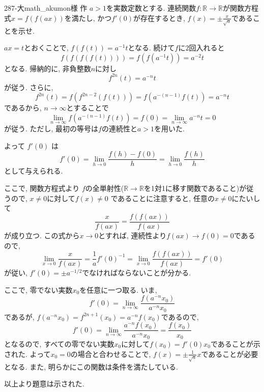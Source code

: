 \begin{thm}{287}{-大}{math\_akumon様 作}
$a>1$を実数定数とする. 連続関数$f:\mathbb{R}\to \mathbb{R}$が関数方程式$x = f(f(ax))$を満たし, かつ$f'(0)$が存在するとき, $f(x) = \pm \frac{x}{\sqrt{a}}$であることを示せ. 
\end{thm}

$ax = t$とおくことで, $f(f(t)) = a^{-1} t$となる. 続けて$f$に$2$回入れると
$$
f(f(f(f(t)))) = f(f(a^{-1}t)) = a^{-2}t
$$
となる. 帰納的に, 非負整数$n$に対し
$$
f^{2n}(t) = a^{-n} t
$$
が従う. さらに, 
$$
f^{2n}(t) = f(f^{2n-2}(f(t))) = f(a^{-(n-1)}f(t) ) = a^{-n}t
$$
であるから, $n\to \infty$とすることで
$$
\lim_{n\to \infty} f(a^{-(n-1)} f(t)) = f(0) = \lim_{n\to \infty} a^{-n}t = 0
$$
が従う. ただし, 最初の等号は$f$の連続性と$a>1$を用いた. 

よって $f'(0)$ は
\[
f'(0) = \lim_{h\to 0} \frac{f(h) - f(0)}{h} = \lim_{h\to 0} \frac{f(h)}{h}
\]
として与えられる. 

ここで, 関数方程式より $f$の全単射性($\mathbb{R}\to \mathbb{R}$を1対1に移す関数であること)が従うので, $x\neq 0$に対して$f(x) \neq 0$ であることに注意すると, 任意の$x\neq 0$にたいして
\[
\frac{x}{f(ax)} = \frac{f(f(ax))}{f(ax)}
\]
が成り立つ. この式から$x\to 0$とすれば, 連続性より$f(ax)\to f(0) = 0$であるので, 
\[
\lim_{x\to 0}\frac{x}{f(ax)} = \frac{1}{a}f'(0)^{-1} = \lim_{x\to 0} \frac{f(f(ax))}{f(ax)} = f'(0)
\]
が従い, $f'(0) = \pm a^{-1/2}$でなければならないことが分かる. 

ここで, 零でない実数$x_0$を任意に一つ取る. いま, 
\[
f'(0) = \lim_{n\to \infty} \frac{f(a^{-n}x_0)}{a^{-n}x_0}
\]
であるが, $f(a^{-n}x_0) = f^{2n+1}(x_0) = a^{-n}f(x_0)$であるので, 
$$
f'(0) = \lim_{n\to \infty} \frac{a^{-n}f(x_0)}{a^{-n}x_0} = \frac{f(x_0)}{x_0}
$$
となるので, すべての零でない実数$x_0$に対して$f(x_0) = f'(0)x_0$であることが示された. よって$x_0=0$の場合と合わせることで, $f(x) = \pm\frac{1}{\sqrt{a}}x$であることが必要となる. また, 明らかにこの関数は条件を満たしている. 

以上より題意は示された. 


